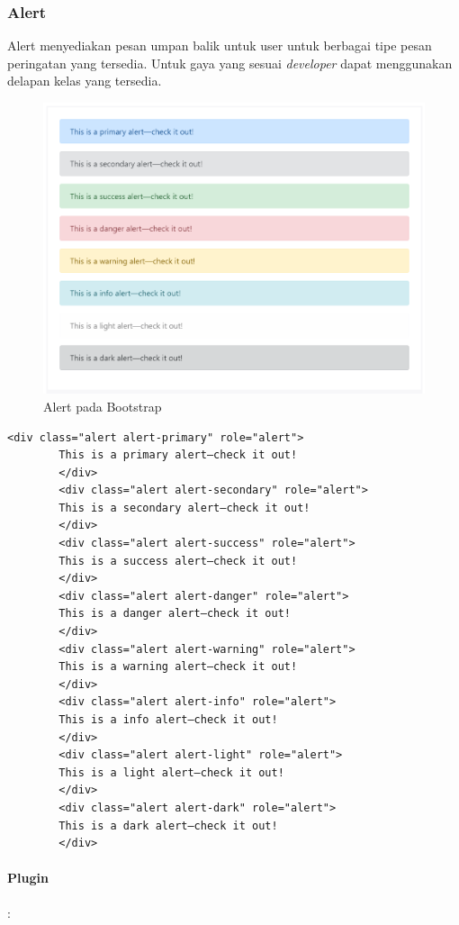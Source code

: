 \documentclass[a4paper,twoside]{article}
\begin{document}
\begin{enumerate}
		\subsubsection{Alert}
		Alert menyediakan pesan umpan balik untuk user untuk berbagai tipe pesan peringatan yang tersedia. Untuk gaya yang sesuai \textit{developer} dapat menggunakan delapan kelas yang tersedia.
		\begin{figure} [H]
			\centering  
			\includegraphics[scale=1.0]{alert_bootstrap.PNG}  
			\caption{Alert pada Bootstrap} 
		\end{figure}
		\begin{lstlisting}[frame=single] 
		<div class="alert alert-primary" role="alert">
		This is a primary alert—check it out!
		</div>
		<div class="alert alert-secondary" role="alert">
		This is a secondary alert—check it out!
		</div>
		<div class="alert alert-success" role="alert">
		This is a success alert—check it out!
		</div>
		<div class="alert alert-danger" role="alert">
		This is a danger alert—check it out!
		</div>
		<div class="alert alert-warning" role="alert">
		This is a warning alert—check it out!
		</div>
		<div class="alert alert-info" role="alert">
		This is a info alert—check it out!
		</div>
		<div class="alert alert-light" role="alert">
		This is a light alert—check it out!
		</div>
		<div class="alert alert-dark" role="alert">
		This is a dark alert—check it out!
		</div>
		\end{lstlisting}
		
		\paragraph{Plugin} :
		

\end{enumerate}
\end{document}
